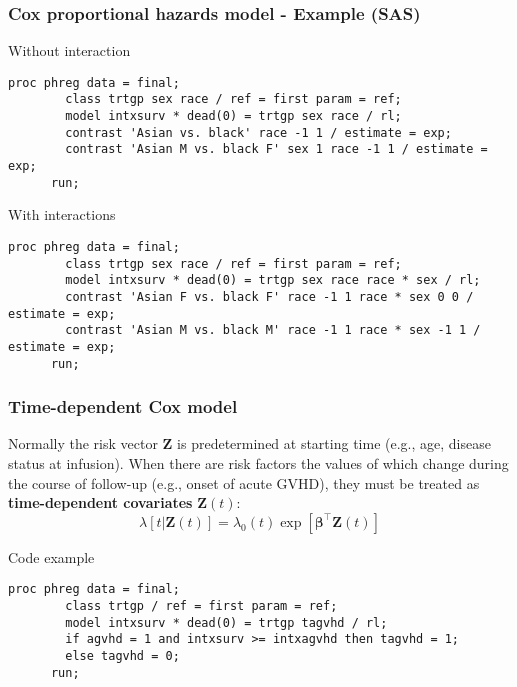 \documentclass[11pt, aspectratio = 169]{beamer}
\begin{document}
\begin{frame}[fragile]
  \frametitle{Cox proportional hazards model - Example (SAS)}
  \begin{block}{Without interaction}
    \begin{lstlisting}[gobble = 6]
      proc phreg data = final;
        class trtgp sex race / ref = first param = ref;
        model intxsurv * dead(0) = trtgp sex race / rl;
        contrast 'Asian vs. black' race -1 1 / estimate = exp;
        contrast 'Asian M vs. black F' sex 1 race -1 1 / estimate = exp;
      run;
    \end{lstlisting}
  \end{block}
  \begin{block}{With interactions}
    \begin{lstlisting}[gobble = 6]
      proc phreg data = final;
        class trtgp sex race / ref = first param = ref;
        model intxsurv * dead(0) = trtgp sex race race * sex / rl;
        contrast 'Asian F vs. black F' race -1 1 race * sex 0 0 / estimate = exp;
        contrast 'Asian M vs. black M' race -1 1 race * sex -1 1 / estimate = exp;
      run;
    \end{lstlisting}
  \end{block}
\end{frame}

\begin{frame}[fragile]
  \frametitle{Time-dependent Cox model}
  Normally the risk vector $\mathbf{Z}$ is predetermined at starting time (e.g., age, disease status at infusion). When there are risk factors the values of which change during the course of follow-up (e.g., onset of acute GVHD), they must be treated as \textbf{time-dependent covariates} $\mathbf{Z}(t)$\footnotemark:
  \begin{equation*}
    \lambda\left[t|\mathbf{Z}(t)\right] = \lambda_{0}(t)\exp\left[\boldsymbol{\beta}^\top\mathbf{Z}(t)\right]
  \end{equation*}
  \begin{block}{Code example}
    \begin{lstlisting}[gobble = 6]
      proc phreg data = final;
        class trtgp / ref = first param = ref;
        model intxsurv * dead(0) = trtgp tagvhd / rl;
        if agvhd = 1 and intxsurv >= intxagvhd then tagvhd = 1;
        else tagvhd = 0;
      run;
    \end{lstlisting}
  \end{block}
\end{frame}
\end{document}
